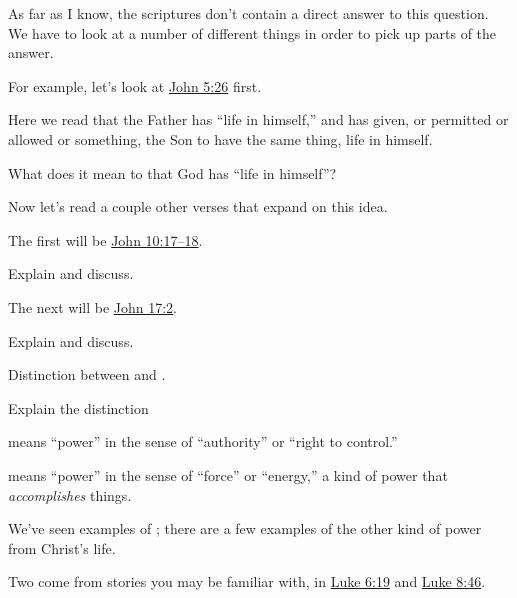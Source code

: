 \begin{compactitem}
\begin{compactitem}
				\end{compactitem}
			\item As far as I know, the scriptures don't contain a direct answer to this question. We have to look at a number of different things in order to pick up parts of the answer.
				\begin{compactitem}
					\item For example, let's look at \hyperref[JOHN-5-26]{John 5:26} first.
						\begin{compactitem}
							\item Here we read that the Father has ``life in himself,'' and has given, or permitted or allowed or something, the Son to have the same thing, life in himself.
							\item What does it mean to that God has ``life in himself''?
						\end{compactitem}
					\item Now let's read a couple other verses that expand on this idea.
					\item The first will be \hyperref[JOHN-10-17]{John 10:17--18}.
						\begin{compactitem}
							\item Explain and discuss.
						\end{compactitem}
					\item The next will be \hyperref[JOHN-17-2]{John 17:2}.
						\begin{compactitem}
							\item Explain and discuss.
						\end{compactitem}
				\end{compactitem}
			\item Distinction between  and \gr{δύναμις}.
				\begin{compactitem}
					\item Explain the distinction
						\begin{compactitem}
							\item {} means ``power'' in the sense of ``authority'' or ``right to control.''
							\item {} means ``power'' in the sense of ``force'' or ``energy,'' a kind of power that \textit{accomplishes} things.
							\item We've seen examples of ; there are a few examples of the other kind of power from Christ's life.
							\item Two come from stories you may be familiar with, in \hyperref[LUKE-6-19]{Luke 6:19} and \hyperref[LUKE-8-46]{Luke 8:46}.

\end{compactitem}
\end{compactitem}
\end{compactitem}
